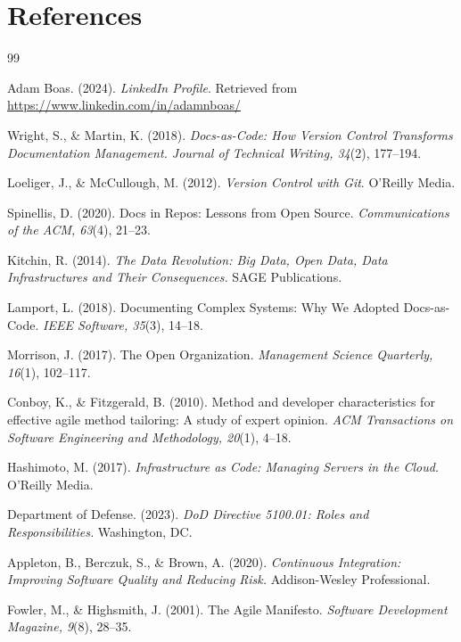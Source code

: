 \documentclass[11pt]{article}
\begin{document}
\section*{References}
\begin{thebibliography}{99}

		Adam Boas. (2024). \textit{LinkedIn Profile}. Retrieved from \url{https://www.linkedin.com/in/adamnboas/}

		Wright, S., \& Martin, K. (2018). \textit{Docs-as-Code: How Version Control Transforms Documentation Management. Journal of Technical Writing, 34}(2), 177--194.

		Loeliger, J., \& McCullough, M. (2012). \textit{Version Control with Git}. O'Reilly Media.

		Spinellis, D. (2020). Docs in Repos: Lessons from Open Source. \textit{Communications of the ACM, 63}(4), 21--23.

		Kitchin, R. (2014). \textit{The Data Revolution: Big Data, Open Data, Data Infrastructures and Their Consequences.} SAGE Publications.

		Lamport, L. (2018). Documenting Complex Systems: Why We Adopted Docs-as-Code. \textit{IEEE Software, 35}(3), 14--18.

		Morrison, J. (2017). The Open Organization. \textit{Management Science Quarterly, 16}(1), 102--117.

		Conboy, K., \& Fitzgerald, B. (2010). Method and developer characteristics for effective agile method tailoring: A study of expert opinion. \textit{ACM Transactions on Software Engineering and Methodology, 20}(1), 4--18.

		Hashimoto, M. (2017). \textit{Infrastructure as Code: Managing Servers in the Cloud.} O'Reilly Media.

		Department of Defense. (2023). \textit{DoD Directive 5100.01: Roles and Responsibilities.} Washington, DC.

		Appleton, B., Berczuk, S., \& Brown, A. (2020). \textit{Continuous Integration: Improving Software Quality and Reducing Risk.} Addison-Wesley Professional.

		Fowler, M., \& Highsmith, J. (2001). The Agile Manifesto. \textit{Software Development Magazine, 9}(8), 28--35.


\end{thebibliography}
\end{document}
